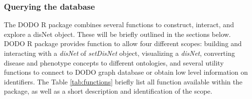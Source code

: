 \documentclass[9pt,a4paper,]{extarticle}
\begin{document}
\hypertarget{querying-the-database}{%
\subsubsection{Querying the database}\label{querying-the-database}}

The DODO R package combines several functions to construct, interact, and explore a disNet object. These will be briefly outlined in the sections below. DODO R package provides function to allow four different scopes: building and interacting with a \emph{disNet} of \emph{setDisNet} object, visualizing a \emph{disNet}, converting disease and phenotype concepts to different ontologies, and several utility functions to connect to DODO graph database or obtain low level information on identifiers. The Table \ref{tab:functions} briefly list all function available within the package, as well as a short description and identification of the scope.
\end{document}
